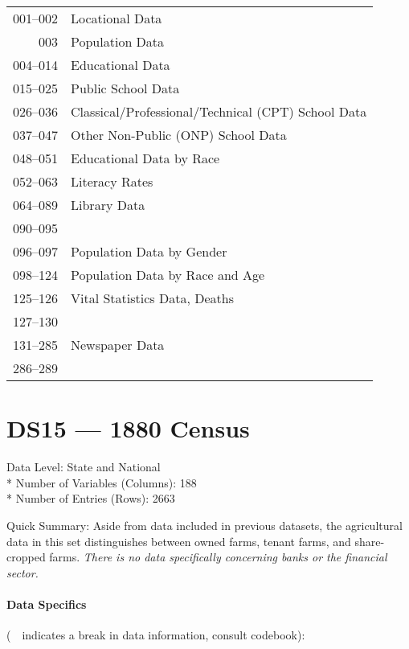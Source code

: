 ﻿\documentclass[12pt]{report}
\begin{document}
	\begin{tabular}{r|l}
		001--002 & Locational Data\\
		003 & Population Data\\
		004--014 & Educational Data\\
		015--025 & Public School Data\\
		026--036 & Classical/Professional/Technical (CPT) School Data\\
		037--047 & Other Non-Public (ONP) School Data\\
		048--051 & Educational Data by Race\\
		052--063 & Literacy Rates\\
		064--089 & Library Data\\
		090--095 & \guillemotleft~\guillemotright\\
		096--097 & Population Data by Gender\\
		098--124 & Population Data by Race and Age\\
		125--126 & Vital Statistics Data, Deaths\\
		127--130 & \guillemotleft~\guillemotright\\
		131--285 & Newspaper Data\\
		286--289 & \guillemotleft~\guillemotright
	\end{tabular}
	\newpage

\section{DS15 --- 1880 Census}
	Data Level: State and National\\*
	Number of Variables (Columns): 188\\*
	Number of Entries (Rows): 2663
	\vspace{1.5em}
	
	\noindent Quick Summary: Aside from data included in previous datasets, the agricultural data in this set distinguishes between owned farms, tenant farms, and share-cropped farms. \textit{There is no data specifically concerning banks or the financial sector.}
	
	\paragraph{Data Specifics} (\guillemotleft~\guillemotright~indicates a break in data information, consult codebook):
	\vspace{1em}
	
\end{document}
